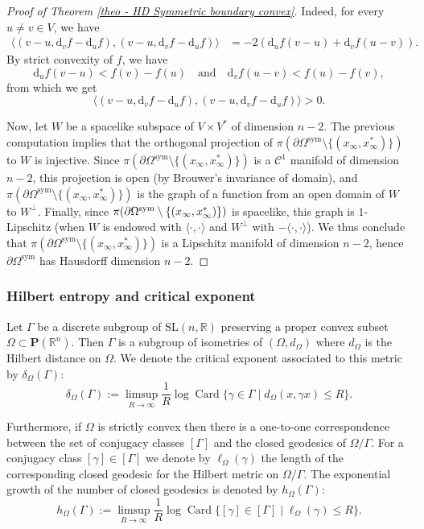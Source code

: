 \documentclass[JEP,XML,SOM,Unicode,NoEqCountersInSection,NoFloatCountersInSection,published]{cedram}
\newcommand{\quand}{\quad\text{and}\quad}
\newcommand{\sym}{\mathrm{sym}}
\theoremstyle{definition}
\newcommand{\proj}{\mathbf{P}}
\newcommand{\R}{\mathbb{R}}
\newcommand{\SL}{\mathrm{SL}}
\DeclareMathOperator{\Card}{Card}
\let\G\Gamma
\let\g\gamma
\begin{document}
\begin{proof}[Proof of Theorem \ref{theo - HD Symmetric boundary convex}]
Indeed, for every $u\neq v \in V$, we have
\begin{align*}
\bigl\langle (v-u, \mathrm d_v f - \mathrm d_u f), (v-u, \mathrm d_v f - \mathrm d_u f)\bigr\rangle &= -2(\mathrm d_u f(v-u) + \mathrm d_v f(u-v)).
\end{align*}
By strict convexity of $f$, we have
\[\mathrm d_u f(v-u) < f(v) - f(u)\quand \mathrm d_v f(u-v) < f(u) - f(v),\]
from which we get
\[\bigl\langle (v-u, \mathrm d_v f - \mathrm d_u f), (v-u, \mathrm d_v f - \mathrm d_u f)\bigr\rangle > 0.\]

Now, let $W$ be a spacelike subspace of $V\times V^*$ of dimension $n-2$. The previous computation implies that the orthogonal projection of $\pi(\partial \Omega^{\sym} \setminus \{(x_\infty, x_\infty^*)\})$ to $W$ is injective. Since $\pi(\partial \Omega^{\sym} \setminus \{(x_\infty, x_\infty^*)\})$ is a $\mathcal C^1$ manifold of dimension $n-2$, this projection is open (by Brouwer's invariance of domain), and $\pi(\partial \Omega^{\sym} \setminus \{(x_\infty, x_\infty^*)\})$ is the graph of a function from an open domain of $W$ to $W^\perp$. Finally, since $\pi(\partial \Omega^{\sym} \setminus\nobreak \{(x_\infty, x_\infty^*)\})$ is spacelike, this graph is $1$-Lipschitz (when $W$ is endowed with $\langle \cdot , \cdot \rangle$ and $W^\perp$ with $-\langle \cdot , \cdot \rangle$). We thus conclude that $\pi(\partial \Omega^{\sym} \setminus \{(x_\infty, x_\infty^*)\})$ is a Lipschitz manifold of dimension $n-2$, hence $\partial \Omega^{\sym}$ has Hausdorff dimension $n-2$.
\end{proof}

\subsubsection{Hilbert entropy and critical exponent}

Let $\G$ be a discrete subgroup of $\SL(n,\R)$ preserving a proper convex subset $\Omega\subset \proj(\R^n)$. Then $\G$ is a subgroup of isometries of $(\Omega,d_\Omega)$ where $d_\Omega$ is the Hilbert distance on $\Omega$. We denote the critical exponent associated to this metric by $\delta_\Omega(\G)$:
\[\delta_\Omega(\G):= \limsup_{R\to \infty} \frac{1}{R} \log \Card \{ \g \in \G \mid d_\Omega(x,\g x) \leq R\}.\]

Furthermore, if $\Omega$ is strictly convex then there is a one-to-one correspondence \hbox{between} the set of conjugacy classes $ [\G]$ and the closed geodesics of $\Omega/\G$. For a conjugacy class $[\g]\in[\G] $ we denote by $\ell_\Omega(\g)$ the length of the corresponding closed geodesic for the Hilbert metric on $\Omega/\G$. The exponential growth of the number of closed geodesics is denoted by $h_\Omega(\G)$:
\[h_\Omega(\G) := \limsup_{R\to \infty} \frac{1}{R} \log \Card \{ [\g] \in [\G] \mid \ell_\Omega(\g)\leq R\}.\]
\end{document}
